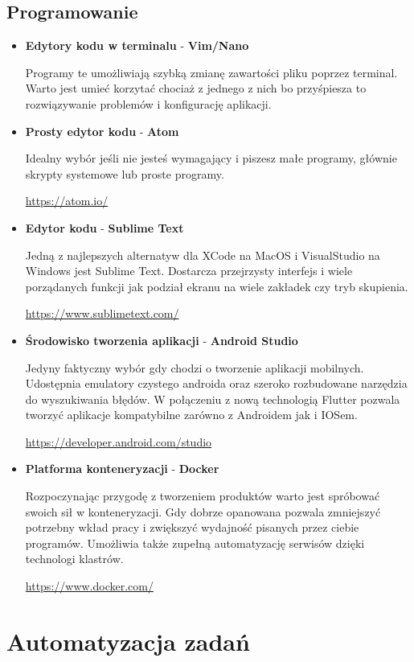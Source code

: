 \documentclass[10pt,a4paper]{report}
\begin{document}
\section{Programowanie}
\begin{itemize}
\item \textbf{Edytory kodu w terminalu} - \textbf{Vim/Nano} \par Programy te umożliwiają szybką zmianę zawartości pliku poprzez terminal. Warto jest umieć korzytać chociaż z jednego z nich bo przyśpiesza to rozwiązywanie problemów i konfigurację aplikacji.
\item \textbf{Prosty edytor kodu} - \textbf{Atom} \par Idealny wybór jeśli nie jesteś wymagający i piszesz małe programy, głównie skrypty systemowe lub proste programy. \par \url{https://atom.io/}
\item \textbf{Edytor kodu} - \textbf{Sublime Text} \par Jedną z najlepszych alternatyw dla XCode na MacOS i VisualStudio na Windows jest Sublime Text. Dostarcza przejrzysty interfejs i wiele porządanych funkcji jak podział ekranu na wiele zakładek czy tryb skupienia. \par \url{https://www.sublimetext.com/}
\item \textbf{Środowisko tworzenia aplikacji} - \textbf{Android Studio} \par Jedyny faktyczny wybór gdy chodzi o tworzenie aplikacji mobilnych. Udostępnia emulatory czystego androida oraz szeroko rozbudowane narzędzia do wyszukiwania błędów. W połączeniu z nową technologią Flutter pozwala tworzyć aplikacje kompatybilne zarówno z Androidem jak i IOSem. \par \url{https://developer.android.com/studio}
\item \textbf{Platforma konteneryzacji} - \textbf{Docker} \par Rozpoczynając przygodę z tworzeniem produktów warto jest spróbować swoich sił w konteneryzacji. Gdy dobrze opanowana pozwala zmniejszyć potrzebny wkład pracy i zwiększyć wydajność pisanych przez ciebie programów. Umożliwia także zupełną automatyzację serwisów dzięki technologi klastrów. \par \url{https://www.docker.com/}
\end{itemize}

	
\chapter{Automatyzacja zadań}
\end{document}
